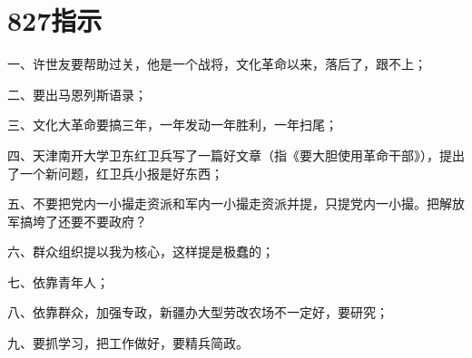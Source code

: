 \section[827指示（一九六七年八月二十七日）]{827指示}


一、许世友要帮助过关，他是一个战将，文化革命以来，落后了，跟不上；

二、要出马恩列斯语录；

三、文化大革命要搞三年，一年发动一年胜利，一年扫尾；

四、天津南开大学卫东红卫兵写了一篇好文章（指《要大胆使用革命干部》），提出了一个新问题，红卫兵小报是好东西；

五、不要把党内一小撮走资派和军内一小撮走资派并提，只提党内一小撮。把解放军搞垮了还要不要政府？

六、群众组织提以我为核心，这样提是极蠢的；

七、依靠青年人；

八、依靠群众，加强专政，新疆办大型劳改农场不一定好，要研究；

九、要抓学习，把工作做好，要精兵简政。


